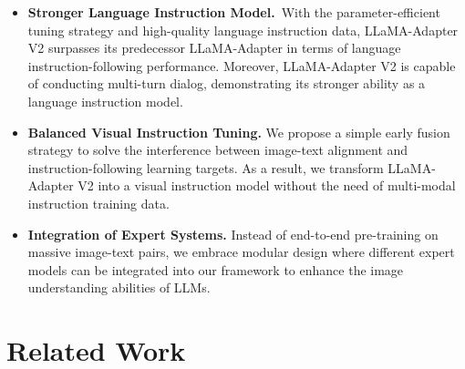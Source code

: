 \documentclass[10pt,twocolumn,letterpaper]{article}
\begin{document}
\begin{itemize}
    \item \textbf{Stronger Language Instruction Model.}~With the parameter-efficient tuning strategy and high-quality language instruction data, LLaMA-Adapter V2 surpasses its predecessor LLaMA-Adapter in terms of language instruction-following performance. Moreover, LLaMA-Adapter V2 is capable of conducting multi-turn dialog, demonstrating its stronger ability as a language instruction model.
    
    \item \textbf{Balanced Visual Instruction Tuning.} We propose a simple early fusion strategy to solve the interference between image-text alignment and instruction-following learning targets. As a result, we transform LLaMA-Adapter V2 into a visual instruction model without the need of multi-modal instruction training data.
    
    \item \textbf{Integration of Expert Systems.} Instead of end-to-end pre-training on massive image-text pairs, we embrace modular design where different expert models can be integrated into our framework to enhance the image understanding abilities of LLMs.
\end{itemize}

\section{Related Work}
\label{sec:related}
\end{document}
